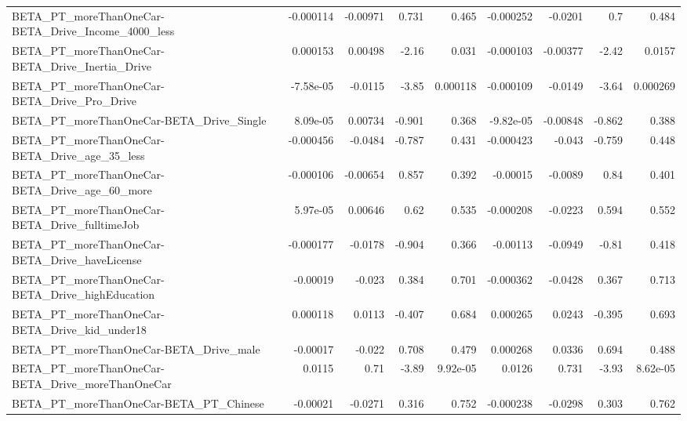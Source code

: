 \begin{tabular}{lrrrrrrrr}
BETA\_PT\_moreThanOneCar-BETA\_Drive\_Income\_4000\_less &   -0.000114 &     -0.00971 &    0.731 &    0.465 &  -0.000252 &     -0.0201 &          0.7 &         0.484 \\
BETA\_PT\_moreThanOneCar-BETA\_Drive\_Inertia\_Drive    &    0.000153 &      0.00498 &    -2.16 &    0.031 &  -0.000103 &    -0.00377 &        -2.42 &        0.0157 \\
BETA\_PT\_moreThanOneCar-BETA\_Drive\_Pro\_Drive        &   -7.58e-05 &      -0.0115 &    -3.85 & 0.000118 &  -0.000109 &     -0.0149 &        -3.64 &      0.000269 \\
BETA\_PT\_moreThanOneCar-BETA\_Drive\_Single           &    8.09e-05 &      0.00734 &   -0.901 &    0.368 &  -9.82e-05 &    -0.00848 &       -0.862 &         0.388 \\
BETA\_PT\_moreThanOneCar-BETA\_Drive\_age\_35\_less      &   -0.000456 &      -0.0484 &   -0.787 &    0.431 &  -0.000423 &      -0.043 &       -0.759 &         0.448 \\
BETA\_PT\_moreThanOneCar-BETA\_Drive\_age\_60\_more      &   -0.000106 &     -0.00654 &    0.857 &    0.392 &   -0.00015 &     -0.0089 &         0.84 &         0.401 \\
BETA\_PT\_moreThanOneCar-BETA\_Drive\_fulltimeJob      &    5.97e-05 &      0.00646 &     0.62 &    0.535 &  -0.000208 &     -0.0223 &        0.594 &         0.552 \\
BETA\_PT\_moreThanOneCar-BETA\_Drive\_haveLicense      &   -0.000177 &      -0.0178 &   -0.904 &    0.366 &   -0.00113 &     -0.0949 &        -0.81 &         0.418 \\
BETA\_PT\_moreThanOneCar-BETA\_Drive\_highEducation    &    -0.00019 &       -0.023 &    0.384 &    0.701 &  -0.000362 &     -0.0428 &        0.367 &         0.713 \\
BETA\_PT\_moreThanOneCar-BETA\_Drive\_kid\_under18      &    0.000118 &       0.0113 &   -0.407 &    0.684 &   0.000265 &      0.0243 &       -0.395 &         0.693 \\
BETA\_PT\_moreThanOneCar-BETA\_Drive\_male             &    -0.00017 &       -0.022 &    0.708 &    0.479 &   0.000268 &      0.0336 &        0.694 &         0.488 \\
BETA\_PT\_moreThanOneCar-BETA\_Drive\_moreThanOneCar   &      0.0115 &         0.71 &    -3.89 & 9.92e-05 &     0.0126 &       0.731 &        -3.93 &      8.62e-05 \\
BETA\_PT\_moreThanOneCar-BETA\_PT\_Chinese             &    -0.00021 &      -0.0271 &    0.316 &    0.752 &  -0.000238 &     -0.0298 &        0.303 &         0.762 \\

\end{tabular}
